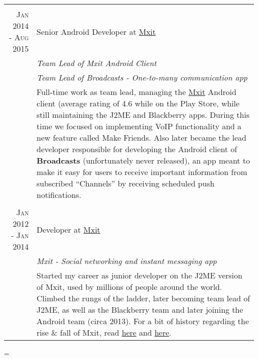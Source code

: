 \documentclass[a4paper,10pt,notitlepage]{article}
\newenvironment{absolutelynopagebreak}
  {\par\nobreak\vfil\penalty0\vfilneg
   \vtop\bgroup}
  {\par\xdef\tpd{\the\prevdepth}\egroup
   \prevdepth=\tpd}
\begin{document}
\begin{absolutelynopagebreak}
\begin{tabular}{r|p{11cm}}
 \multicolumn{2}{c}{} \\
 \textsc{Jan 2014 - Aug 2015} & Senior Android Developer at \href{www.mxit.com}{Mxit} \\
 &\emph{Team Lead of Mxit Android Client}\\
 &\emph{Team Lead of Broadcasts - One-to-many communication app}\\
 &\footnotesize{Full-time work as team lead, managing the \href{https://en.wikipedia.org/wiki/Mxit}{Mxit} Android client (average rating of 4.6 while on the Play Store, while still maintaining the J2ME and Blackberry apps. During this time we focused on implementing VoIP functionality and a new feature called Make Friends. Also later became the lead developer responsible for developing the Android client of \textbf{Broadcasts} (unfortunately never released), an app meant to make it easy for users to receive important information from subscribed ``Channels'' by receiving scheduled push notifications. }\\
 
 \multicolumn{2}{c}{} \\
\textsc{Jan 2012 - Jan 2014} & Developer at \href{www.mxit.com}{Mxit} \\
&\emph{Mxit - Social networking and instant messaging app} \\
&\footnotesize{Started my career as junior developer on the J2ME version of Mxit, used by millions of people around the world. Climbed the rungs of the ladder, later becoming team lead of J2ME, as well as the Blackberry team and later joining the Android team (circa 2013). For a bit of history regarding the rise \& fall of Mxit, read \href{https://en.wikipedia.org/wiki/Mxit}{here} and \href{https://www.moneyweb.co.za/news/companies-and-deals/how-did-mxit-go-so-wrong/}{here}.}
\\

\end{tabular}

\end{absolutelynopagebreak}
\end{document}
